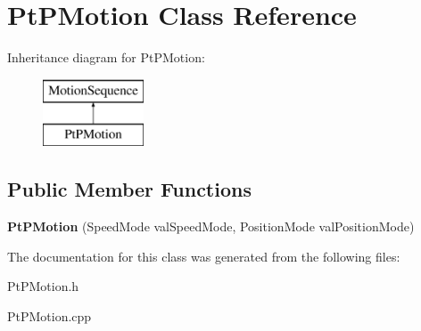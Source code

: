 \hypertarget{class_pt_p_motion}{}\section{Pt\+P\+Motion Class Reference}
\label{class_pt_p_motion}
Inheritance diagram for Pt\+P\+Motion\+:\begin{figure}[H]
\begin{center}
\leavevmode
\includegraphics[height=2.000000cm]{class_pt_p_motion}
\end{center}
\end{figure}
\subsection*{Public Member Functions}
\begin{DoxyCompactItemize}
\item 
\mbox{\label{class_pt_p_motion_acce1a2ec521ae2aa6c96fa42ddc5d954}} 
{\bfseries Pt\+P\+Motion} (Speed\+Mode val\+Speed\+Mode, Position\+Mode val\+Position\+Mode)
\end{DoxyCompactItemize}


The documentation for this class was generated from the following files\+:\begin{DoxyCompactItemize}
\item 
Pt\+P\+Motion.\+h\item 
Pt\+P\+Motion.\+cpp\end{DoxyCompactItemize}
